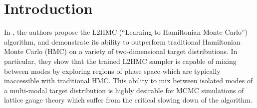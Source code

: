 \documentclass{article} %
\begin{document}
%  
\section{\label{sec:introduction}Introduction}
In \citet{levy2017}, the authors propose the L2HMC (``Learning to Hamiltonian Monte Carlo'') algorithm, and demonstrate
its ability to outperform traditional Hamiltonian Monte Carlo (HMC) on a variety of two-dimensional target
distributions.
%
In particular, they show that the trained L2HMC sampler is capable of mixing between modes by exploring regions of phase space which are typically inaccessible with traditional HMC.
%
This ability to mix between isolated modes of a multi-modal target distribution is highly desirable for MCMC simulations of lattice gauge theory which suffer from the critical slowing down \citet{schaefer2009investigating} of the algorithm.

%
\end{document}
